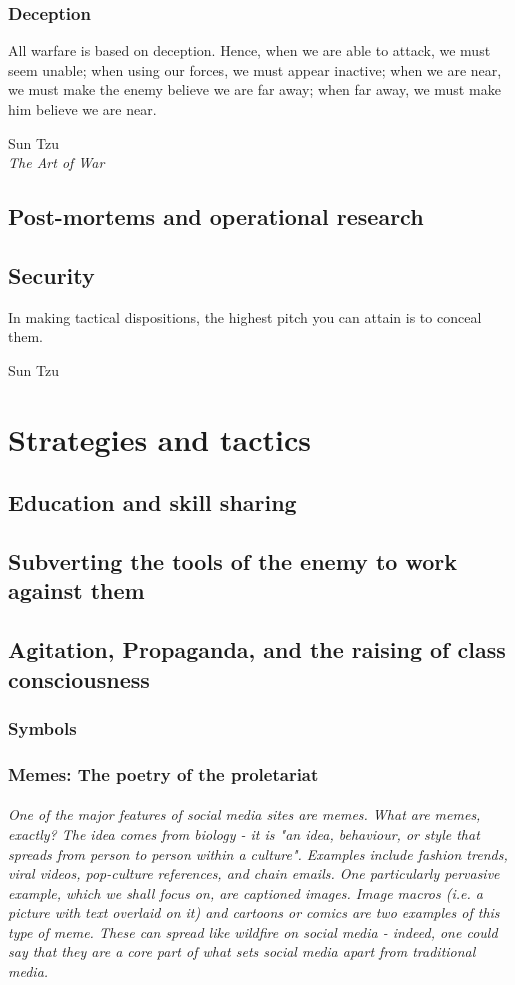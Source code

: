 \documentclass[11pt,fleqn]{memoir} %
\begin{document}
  	\section{Deception}
    \epigraph{All warfare is based on deception. Hence, when we are able to attack, we must seem unable; when using our forces, we must appear inactive; when we are near, we must make the enemy believe we are far away; when far away, we must make him believe we are near.}{Sun Tzu\\ \textit{The Art of War}}
    
    
  \chapter{Post-mortems and operational research}
  
  
  \chapter{Security}
    \epigraph{In making tactical dispositions, the highest pitch you can attain is to conceal them.}{Sun Tzu}
  
\part{Strategies and tactics}
  \chapter{Education and skill sharing}
  
  
  \chapter{Subverting the tools of the enemy to work against them}
  
  
  \chapter{Agitation, Propaganda, and the raising of class consciousness}
	\section{Symbols}
    \section{Memes: The poetry of the proletariat}
      \paragraph{One of the major features of social media sites are memes. What are memes, exactly? The idea comes from biology - it is "an idea, behaviour, or style that spreads from person to person within a culture". Examples include fashion trends, viral videos, pop-culture references, and chain emails. One particularly pervasive example, which we shall focus on, are captioned images. Image macros (i.e. a picture with text overlaid on it) and cartoons or comics are two examples of this type of meme. These can spread like wildfire on social media - indeed, one could say that they are a core part of what sets social media apart from traditional media.}
    
\end{document}

